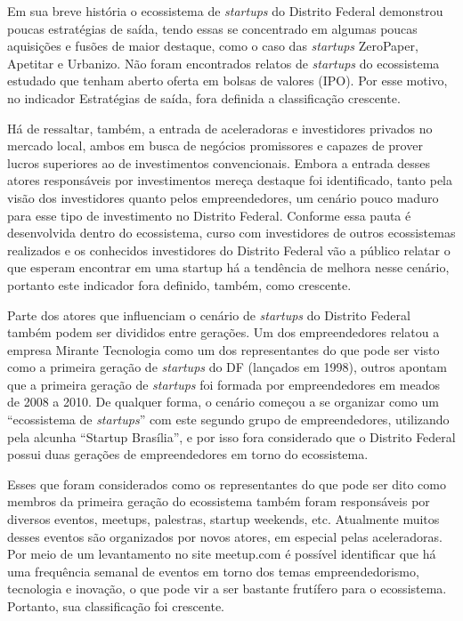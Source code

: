 Em sua breve história o ecossistema de \textit{startups} do Distrito Federal demonstrou poucas estratégias de saída, tendo essas se concentrado em algumas poucas aquisições e fusões de maior destaque, como o caso das \textit{startups} ZeroPaper, Apetitar e Urbanizo. Não foram encontrados relatos de \textit{startups} do ecossistema estudado que tenham aberto oferta em bolsas de valores (IPO). Por esse motivo, no indicador Estratégias de saída, fora definida a classificação crescente. 

Há de ressaltar, também, a entrada de aceleradoras e investidores privados no mercado local, ambos em busca de negócios promissores e capazes de prover lucros superiores ao de investimentos convencionais. Embora a entrada desses atores responsáveis por investimentos mereça destaque foi identificado, tanto pela visão dos investidores quanto pelos empreendedores, um cenário pouco maduro para esse tipo de investimento no Distrito Federal. Conforme essa pauta é desenvolvida dentro do ecossistema, curso com investidores de outros ecossistemas realizados e os conhecidos investidores do Distrito Federal vão a público relatar o que esperam encontrar em uma startup há a tendência de melhora nesse cenário, portanto este indicador fora definido, também, como crescente.

Parte dos atores que influenciam o cenário de \textit{startups} do Distrito Federal também podem ser divididos entre gerações. Um dos empreendedores relatou a empresa Mirante Tecnologia como um dos representantes do que pode ser visto como a primeira geração de \textit{startups} do DF (lançados em 1998), outros apontam que a primeira geração de \textit{startups} foi formada por empreendedores em meados de 2008 a 2010. De qualquer forma, o cenário começou a se organizar como um ``ecossistema de \textit{startups}'' com este segundo grupo de empreendedores, utilizando pela alcunha ``Startup Brasília'', e por isso fora considerado que o Distrito Federal possui duas gerações de empreendedores em torno do ecossistema.

Esses que foram considerados como os representantes do que pode ser dito como membros da primeira geração do ecossistema também foram responsáveis por diversos eventos, meetups, palestras, startup weekends, etc. Atualmente muitos desses eventos são organizados por novos atores, em especial pelas aceleradoras. Por meio de um levantamento no site meetup.com é possível identificar que há uma frequência semanal de eventos em torno dos temas empreendedorismo, tecnologia e inovação, o que pode vir a ser bastante frutífero para o ecossistema. Portanto, sua classificação foi crescente.

